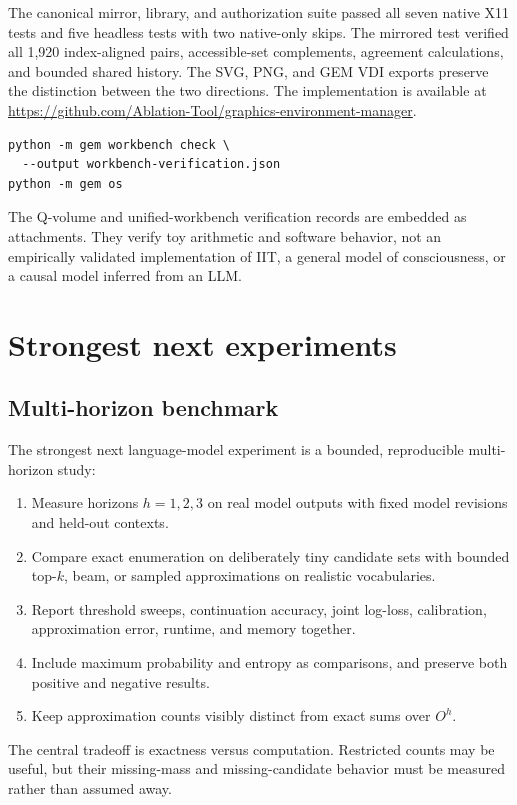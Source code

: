 \documentclass[11pt,a4paper]{article}
\begin{document}
The canonical mirror, library, and authorization suite passed all seven native X11 tests and five headless tests with two native-only skips. The mirrored test verified all 1,920 index-aligned pairs, accessible-set complements, agreement calculations, and bounded shared history. The SVG, PNG, and GEM VDI exports preserve the distinction between the two directions. The implementation is available at \url{https://github.com/Ablation-Tool/graphics-environment-manager}.

\begin{lstlisting}
python -m gem workbench check \
  --output workbench-verification.json
python -m gem os
\end{lstlisting}

The Q-volume and unified-workbench verification records are embedded as attachments. They verify toy arithmetic and software behavior, not an empirically validated implementation of IIT, a general model of consciousness, or a causal model inferred from an LLM.

\section{Strongest next experiments}
\subsection{Multi-horizon benchmark}
The strongest next language-model experiment is a bounded, reproducible multi-horizon study:
\begin{enumerate}[nosep]
  \item Measure horizons $h=1,2,3$ on real model outputs with fixed model revisions and held-out contexts.
  \item Compare exact enumeration on deliberately tiny candidate sets with bounded top-$k$, beam, or sampled approximations on realistic vocabularies.
  \item Report threshold sweeps, continuation accuracy, joint log-loss, calibration, approximation error, runtime, and memory together.
  \item Include maximum probability and entropy as comparisons, and preserve both positive and negative results.
  \item Keep approximation counts visibly distinct from exact sums over $O^h$.
\end{enumerate}
The central tradeoff is exactness versus computation. Restricted counts may be useful, but their missing-mass and missing-candidate behavior must be measured rather than assumed away.
\end{document}
